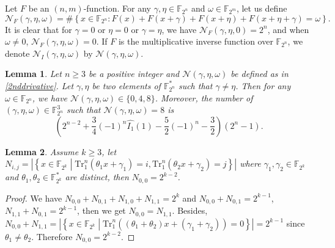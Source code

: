 \documentclass[runningheads,a4paper]{article}
\newtheorem{proof}{Proof}
\newtheorem{lemma}{Lemma}
\newcommand{\F}{\mathbb{F}}
\newcommand{\0}{\textbf{0}}
\newcommand{\1}{\textbf{1}}
\renewcommand{\Tr}{\mathrm{Tr}_1^n}
\begin{document}
Let $F$ be an $(n,m)$-function. For any $\gamma,\eta\in\F_{2^n}$ and
$\omega\in\F_{2^m}$, let us define
\begin{equation}
\label{2nddrivative}
\mathcal{N}_F(\gamma,\eta,\omega)=\#\left\{x\in\F_{2^n} : F(x)+F(x+\gamma)+F(x+\eta)+F(x+\eta+\gamma)=\omega\right\}.
\end{equation}
It is clear that for $\gamma=0$ or $\eta=0$ or $\gamma=\eta$, we have $\mathcal{N}_F(\gamma,\eta,0)=2^n$, and when $\omega\neq 0$, $\mathcal{N}_F(\gamma,\eta,\omega)=0$. If $F$ is the multiplicative inverse function over $\mathbb F_{2^n}$, we denote $\mathcal{N}_I(\gamma,\eta,\omega)$ by $\mathcal{N}(\gamma,\eta,\omega)$.

\begin{lemma}\label{Secondderivativesolution}
Let $n\geq 3$ be a positive integer and $\mathcal{N}(\gamma,\eta,\omega)$ be defined as in \eqref{2nddrivative}.
Let $\gamma,\eta$ be two elements of $\F_{2^n}^*$ such that $\gamma\neq \eta$. Then for any $\omega\in\F_{2^n}$,  we have $\mathcal{N}(\gamma,\eta,\omega)\in \{0,4,8\}$.
Moreover, the number of $(\gamma,\eta,\omega)\in\F_{2^n}^3$ such that $\mathcal{N}(\gamma,\eta,\omega)=8$ is
$$\left(2^{n-2}+\frac{3}{4}(-1)^{n}\widehat{I_1}(1)-\frac{5}{2}(-1)^{n}-\frac{3}{2}\right)\left(2^n-1\right).$$
\end{lemma}

\begin{lemma}\label{lemma:N_ij_tracefunction}
    Assume  $ k\ge 3 $, let $ N_{i,j} =\left\lvert\left\{x\in\F_{2^k}\middle|\Tr\left(\theta_1x+\gamma_1\right)=i,\Tr\left(\theta_2x+\gamma_2\right)=j\right\}\right\rvert $ 
    where  $ \gamma_1,\gamma_2\in\F_{2^k} $ and $ \theta_1,\theta_2\in\F_{2^k}^* $ are distinct, then $ N_{0,0} =2^{k-2} $.
\end{lemma}   
  
  \begin{proof}
      We have $ N_{0,0}+N_{0,1}+N_{1,0}+N_{1,1}=2^k $ and $ N_{0,0}+N_{0,1}=2^{k-1} $, $ N_{1,1}+N_{0,1}=2^{k-1}  $, then we get 
      $ N_{0,0} = N_{1,1} $. 
      Besides, $ N_{0,0}+N_{1,1} = \left\lvert\left\{x\in\F_{2^k}\middle|\Tr\left((\theta_1+\theta_2)x+(\gamma_1+\gamma_2)\right)=0\right\}\right\rvert=2^{k-1} $  since $ \theta_1\ne \theta_2 $. 
       Therefore $ N_{0,0}=2^{k-2} $.
  \end{proof}
  
\end{document}
